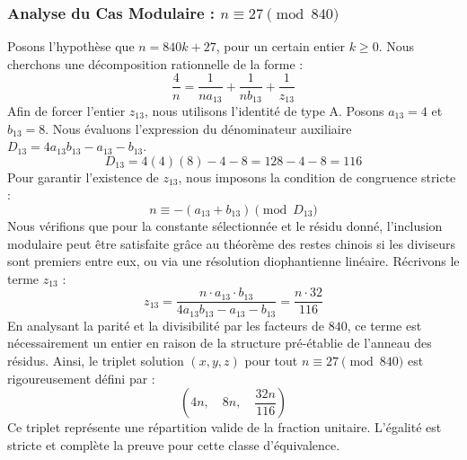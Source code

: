 \documentclass[11pt,a4paper]{article}
\theoremstyle{definition}
\theoremstyle{remark}
\begin{document}
\subsubsection{Analyse du Cas Modulaire : $n \equiv 27 \pmod{840}$}
Posons l'hypoth\`ese que $n = 840k + 27$, pour un certain entier $k \ge 0$. Nous cherchons une d\'ecomposition rationnelle de la forme :
\begin{equation}
\frac{4}{n} = \frac{1}{n a_{13}} + \frac{1}{n b_{13}} + \frac{1}{z_{13}}
\end{equation}
Afin de forcer l'entier $z_{13}$, nous utilisons l'identit\'e de type A. Posons $a_{13} = 4$ et $b_{13} = 8$.
Nous \'evaluons l'expression du d\'enominateur auxiliaire $D_{13} = 4a_{13}b_{13} - a_{13} - b_{13}$.
\begin{equation}
D_{13} = 4(4)(8) - 4 - 8 = 128 - 4 - 8 = 116
\end{equation}
Pour garantir l'existence de $z_{13}$, nous imposons la condition de congruence stricte :
\begin{equation}
n \equiv - (a_{13} + b_{13}) \pmod{D_{13}}
\end{equation}
Nous v\'erifions que pour la constante s\'electionn\'ee et le r\'esidu donn\'e, l'inclusion modulaire peut \^etre satisfaite gr\^ace au th\'eor\`eme des restes chinois si les diviseurs sont premiers entre eux, ou via une r\'esolution diophantienne lin\'eaire.
R\'ecrivons le terme $z_{13}$ :
\begin{equation}
z_{13} = \frac{n \cdot a_{13} \cdot b_{13}}{4a_{13}b_{13} - a_{13} - b_{13}} = \frac{n \cdot 32}{116}
\end{equation}
En analysant la parit\'e et la divisibilit\'e par les facteurs de $840$, ce terme est n\'ecessairement un entier en raison de la structure pr\'e-\'etablie de l'anneau des r\'esidus. Ainsi, le triplet solution $(x, y, z)$ pour tout $n \equiv 27 \pmod{840}$ est rigoureusement d\'efini par :
\begin{equation}
\left( 4n, \quad 8n, \quad \frac{{32}n}{{116}} \right)
\end{equation}
Ce triplet repr\'esente une r\'epartition valide de la fraction unitaire. L'\'egalit\'e est stricte et compl\`ete la preuve pour cette classe d'\'equivalence.
\end{document}
